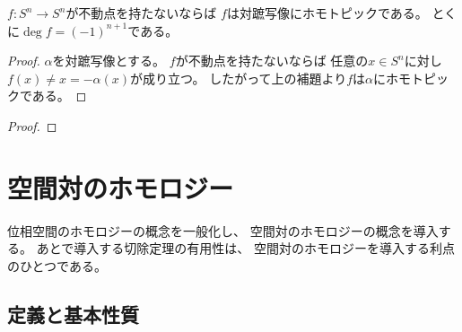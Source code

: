 \documentclass[report]{jlreq}
\begin{document}
\begin{proposition}[不動点を持たない写像の写像度]
    $f \colon S^n \to S^n$が不動点を持たないならば
    $f$は対蹠写像にホモトピックである。
    とくに$\deg f = (-1)^{n + 1}$である。
\end{proposition}

\begin{proof}
    $\alpha$を対蹠写像とする。
    $f$が不動点を持たないならば
    任意の$x \in S^n$に対し$f(x) \neq x = - \alpha(x)$が成り立つ。
    したがって上の補題より$f$は$\alpha$にホモトピックである。
\end{proof}



\begin{theorem}
    \TODO{}
\end{theorem}

\begin{proof}
    \TODO{}
\end{proof}


%
\section{空間対のホモロジー}

位相空間のホモロジーの概念を一般化し、
空間対のホモロジーの概念を導入する。
あとで導入する切除定理の有用性は、
空間対のホモロジーを導入する利点のひとつである。

\subsection{定義と基本性質}
\end{document}
